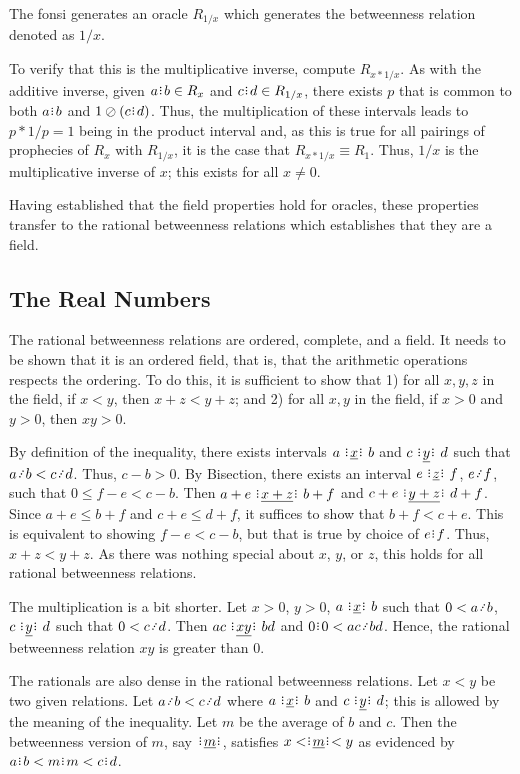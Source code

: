 \documentclass[12pt]{article}
\begin{document}
\begin{enumerate}
    The fonsi generates an oracle $R_{1/x}$ which generates the betweenness relation denoted as $1/x$. 

    To verify that this is the multiplicative inverse, compute $R_{x*1/x}$. As with the additive inverse, given $a\rint b \in R_x$ and $c\rint d \in R_{1/x}$, there exists $p$ that is common to both $a\rint b$ and $1 \oslash (c\rint d)$. Thus, the multiplication of these intervals leads to $p *1/p = 1$ being in the product interval and, as this is true for all pairings of prophecies of $R_{x}$ with $R_{1/x}$, it is the case that $R_{x*1/x} \equiv R_1$. Thus, $1/x$ is the multiplicative inverse of $x$; this exists for all $x \neq 0$. 

\end{enumerate}

Having established that the field properties hold for oracles, these properties transfer to the rational betweenness relations which establishes that they are a field. 


\subsection{The Real Numbers}

The rational betweenness relations are ordered, complete, and a field. It needs to be shown that it is an ordered field, that is, that the arithmetic operations respects the ordering. To do this, it is sufficient to show that 1) for all $x, y, z$ in the field, if $x<y$, then $x + z < y +z$; and 2) for all $x, y$ in the field, if $x >0$ and $y>0$, then $xy > 0 $.

By definition of the inequality, there exists intervals $ a \xrel[x] b$ and $c \xrel[y] d$ such that $a \lte b < c \lte d$. Thus, $c-b > 0$. By Bisection, there exists an interval $e \xrel[z] f$, $e \lte f$, such that $0 \leq f-e < c-b$. Then $a+e \xrel[x+z] b+f$ and $c+e \xrel[y+z] d+f$. Since $a+e \leq  b+f$ and $c+e \leq d+f$, it suffices to show that $b+f < c+e$. This is equivalent to showing $f-e < c-b$, but that is true by choice of $e\rint f$. Thus, $x+z < y+z$. As there was nothing special about $x$, $y$, or $z$, this holds for all rational betweenness relations. 

The multiplication is a bit shorter. Let $x >0 $, $y >0$, $a \xrel b$ such that $0<a \lte b$, $c \xrel[y] d$ such that $0 < c \lte d$. Then $ac \xrel[xy] bd$ and $0\rint 0 < ac \lte bd$. Hence, the rational betweenness relation $xy$ is greater than 0. 

The rationals are also dense in the rational betweenness relations. Let $x < y$ be two given relations. Let $a \lte b < c \lte d$ where $a \xrel b$ and $c \xrel[y] d$; this is allowed by the meaning of the inequality. Let $m$ be the average of $b$ and $c$. Then the betweenness version of $m$, say $\xrel[m]$, satisfies $x < \xrel[m] < y$ as evidenced by $a\rint b < m\rint m < c\rint d$.
\end{document}
